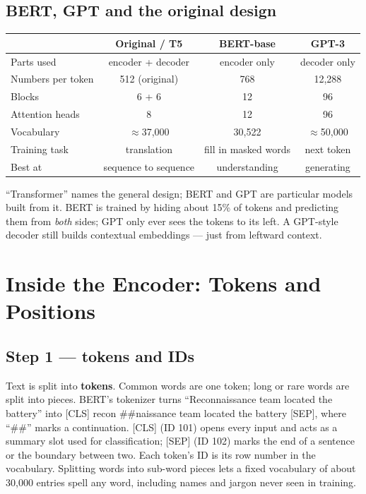 \documentclass[11pt]{article}
\begin{document}
\subsection{BERT, GPT and the original design}
\begin{center}\small\renewcommand{\arraystretch}{1.25}
\begin{tabular}{lccc}\toprule
 & \textbf{Original / T5} & \textbf{BERT-base} & \textbf{GPT-3}\\\midrule
Parts used & encoder + decoder & encoder only & decoder only\\
Numbers per token & 512 (original) & 768 & 12,288\\
Blocks & 6 + 6 & 12 & 96\\
Attention heads & 8 & 12 & 96\\
Vocabulary & $\approx$37,000 & 30,522 & $\approx$50,000\\
Training task & translation & fill in masked words & next token\\
Best at & sequence to sequence & understanding & generating\\\bottomrule
\end{tabular}\end{center}
``Transformer'' names the general design; BERT and GPT are particular models built from it. BERT is trained by hiding about 15\% of tokens and predicting them from \emph{both} sides; GPT only ever sees the tokens to its left. A GPT-style decoder still builds contextual embeddings --- just from leftward context.

\section{Inside the Encoder: Tokens and Positions}
\subsection{Step 1 --- tokens and IDs}
Text is split into \textbf{tokens}. Common words are one token; long or rare words are split into pieces. BERT's tokenizer turns ``Reconnaissance team located the battery'' into [CLS] recon \#\#naissance team located the battery [SEP], where ``\#\#'' marks a continuation. [CLS] (ID 101) opens every input and acts as a summary slot used for classification; [SEP] (ID 102) marks the end of a sentence or the boundary between two. Each token's ID is its row number in the vocabulary. Splitting words into sub-word pieces lets a fixed vocabulary of about 30,000 entries spell any word, including names and jargon never seen in training.
\end{document}
